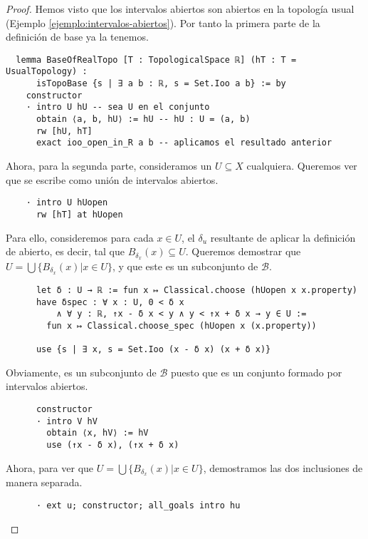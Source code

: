 \begin{proof}

  Hemos visto que los intervalos abiertos son abiertos en la topología usual (Ejemplo \ref{ejemplo:intervalos-abiertos}). Por tanto la primera parte de la definición de base ya la tenemos.

  \begin{lstlisting}
  lemma BaseOfRealTopo [T : TopologicalSpace ℝ] (hT : T = UsualTopology) :
      isTopoBase {s | ∃ a b : ℝ, s = Set.Ioo a b} := by
    constructor
    · intro U hU -- sea U en el conjunto
      obtain ⟨a, b, hU⟩ := hU -- hU : U = (a, b)
      rw [hU, hT]
      exact ioo_open_in_R a b -- aplicamos el resultado anterior \end{lstlisting}

  Ahora, para la segunda parte, consideramos un $U \subseteq X$ cualquiera. Queremos ver que se escribe como unión de intervalos abiertos.

  \begin{lstlisting}
    · intro U hUopen
      rw [hT] at hUopen \end{lstlisting}
  
  Para ello, consideremos para cada $x \in U$, el $\delta_u$ resultante de aplicar la definición de abierto, es decir, tal que $B_{\delta_x}(x) \subseteq U$. Queremos demostrar que $U = \bigcup \{B_{\delta_x}(x) | x \in U\}$, y que este es un subconjunto de $\mathcal{B}$.

  \begin{lstlisting}
      let δ : U → ℝ := fun x ↦ Classical.choose (hUopen x x.property)
      have δspec : ∀ x : U, 0 < δ x
          ∧ ∀ y : ℝ, ↑x - δ x < y ∧ y < ↑x + δ x → y ∈ U :=
        fun x ↦ Classical.choose_spec (hUopen x (x.property))

      use {s | ∃ x, s = Set.Ioo (x - δ x) (x + δ x)} \end{lstlisting}

  Obviamente, es un subconjunto de $\mathcal{B}$ puesto que es un conjunto formado por intervalos abiertos.

  \begin{lstlisting}
      constructor
      · intro V hV
        obtain ⟨x, hV⟩ := hV
        use (↑x - δ x), (↑x + δ x) \end{lstlisting}

  Ahora, para ver que $U = \bigcup \{B_{\delta_x}(x) | x \in U\}$, demostramos las dos inclusiones de manera separada.

  \begin{lstlisting}
      · ext u; constructor; all_goals intro hu \end{lstlisting}


\end{proof}
